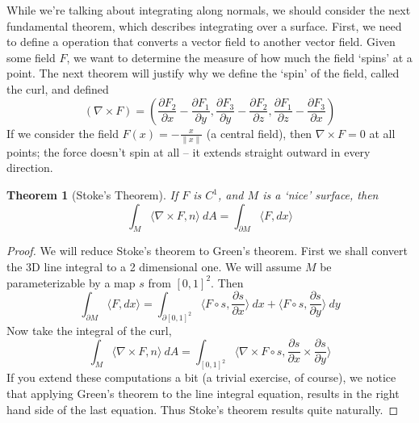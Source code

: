 \documentclass[12pt]{amsbook}
\theoremstyle{plain}
\newtheorem{theorem}{Theorem}
\theoremstyle{definition}
\begin{document}
While we're talking about integrating along normals, we should consider the next fundamental theorem, which describes integrating over a surface. First, we need to define a operation that converts a vector field to another vector field. Given some field $F$, we want to determine the measure of how much the field `spins' at a point. The next theorem will justify why we define the `spin' of the field, called the curl, and defined
%
\[ (\nabla \times F) = \left(\frac{\partial F_2}{\partial x} - \frac{\partial F_1}{\partial y}, \frac{\partial F_3}{\partial y} - \frac{\partial F_2}{\partial z}, \frac{\partial F_1}{\partial z} - \frac{\partial F_3}{\partial x}\right) \]
%
If we consider the field $F(x) = -\frac{x}{\|x\|}$ (a central field), then $\nabla \times F = 0$ at all points; the force doesn't spin at all -- it extends straight outward in every direction.

\begin{theorem}[Stoke's Theorem]
    If $F$ is $C^1$, and $M$ is a `nice' surface, then
    \[ \int_M \langle \nabla \times F, n \rangle\ dA = \int_{\partial M} \langle F, dx \rangle \]
\end{theorem}
\begin{proof}
    We will reduce Stoke's theorem to Green's theorem. First we shall convert the 3D line integral to a 2 dimensional one. We will assume $M$ be parameterizable by a map $s$ from $[0,1]^2$. Then
    \[ \int_{\partial M} \langle F, dx \rangle = \int_{\partial [0,1]^2} \langle F \circ s, \frac{\partial s}{\partial x} \rangle\ dx + \langle F \circ s, \frac{\partial s}{\partial y} \rangle\ dy \]
    Now take the integral of the curl,
    \[ \int_M \langle \nabla \times F, n \rangle\ dA = \int_{[0,1]^2} \langle \nabla \times F \circ s, \frac{\partial s}{\partial x} \times \frac{\partial s}{\partial y} \rangle \]
    If you extend these computations a bit (a trivial exercise, of course), we notice that applying Green's theorem to the line integral equation, results in the right hand side of the last equation. Thus Stoke's theorem results quite naturally.
\end{proof}
\end{document}
